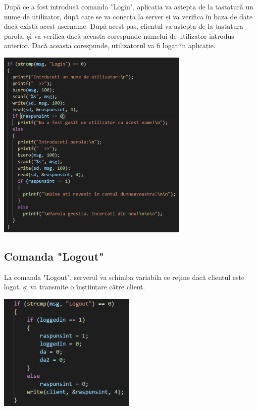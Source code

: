 \documentclass[a4paper,12pt]{article}
\begin{document}
\tab
După ce a fost introdusă comanda "Login", aplicația va aștepta de la tastatură un nume de utilizator, după care se va conecta la server și va verifica în baza de date dacă există acest username. 
După acest pas, clientul va aștepta de la tastatura parola, și va verifica dacă aceasta corespunde numelui de utilizator introdus anterior.
Dacă aceasta corespunde, utilizatorul va fi logat în aplicație.

\bigskip

\begin{center}
\includegraphics[width=0.7\textwidth]{Login.png}
\end{center}

\bigskip
\bigskip
\bigskip

\subsection{Comanda "Logout"}

\tab
La comanda "Logout", serverul va schimba variabila ce reține dacă clientul este logat, și va transmite o înștiințare către client.

\bigskip

\begin{center}
\includegraphics[width=0.5\textwidth]{Logout.png}
\end{center}
\end{document}
